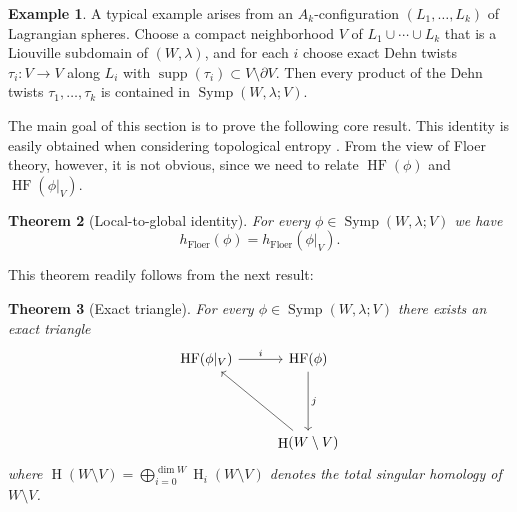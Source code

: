 \documentclass[12pt]{article}
\theoremstyle{theorem}
\newtheorem{theorem}{Theorem}[section]
\theoremstyle{definition}
\newtheorem{example}[theorem]{Example}
\theoremstyle{remark}
\numberwithin{equation}{section}
\newcommand{\p}{\partial}
\DeclareMathOperator{\floer}{Floer}
\DeclareMathOperator{\supp}{supp}
\DeclareMathOperator{\Symp}{Symp}
\DeclareMathOperator{\HF}{HF}
\DeclareMathOperator{\Ho}{H}
\begin{document}
\begin{example} A typical example arises from an $A_k$-configuration $(L_1,\dots,L_k)$ of Lagrangian spheres.
Choose a compact neighborhood $V$ of $L_1\cup\cdots\cup L_k$ that is a Liouville subdomain of $(W,\lambda)$, and for each $i$ choose exact Dehn twists $\tau_i\colon V\to V$ along $L_i$ with $\supp (\tau_i)\subset V\setminus \p V$.
Then every product of the Dehn twists $\tau_1,\dots,\tau_k$ is contained in $\Symp(W,\lambda;V)$.
\end{example}


The main goal of this section is to prove the following core result.
This identity is easily obtained when considering topological entropy \cite[Proposition~3.1.7]{KaHa95}.
From the view of Floer theory, however, it is not obvious, since we need to relate $\HF(\phi)$ and $\HF(\phi|_V)$.
\begin{theorem}[Local-to-global identity]\label{thm: localtoglobal}
For every $\phi\in \Symp(W,\lambda;V)$ we have $$
h_{\floer}(\phi)=h_{\floer}(\phi|_V).
$$	
\end{theorem}
This theorem readily follows from the next result:
\begin{theorem}[Exact triangle]\label{thm: exact_triangle}
For every $\phi\in \Symp(W,\lambda;V)$ there exists an exact triangle
\begin{equation}\label{eq: exact_tri}
\begin{tikzcd}[row sep=1.5cm]
\HF(\phi|_V)  \arrow[r,"i"] & \HF(\phi) \arrow[d,"j"]\\
 & \arrow[ul] \Ho(W\setminus V)  
\end{tikzcd}
\end{equation}
where $\Ho(W\setminus V)=\bigoplus_{i=0}^{\dim W} \Ho_i(W\setminus V)$ denotes the total singular homology of $W\setminus V$.
\end{theorem}
\end{document}
